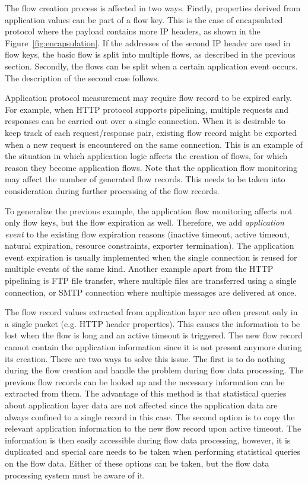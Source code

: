 The flow creation process is affected in two ways. Firstly, properties derived from application values can be part of a flow key. This is the case of encapsulated protocol where the payload contains more IP headers, as shown in the Figure~\ref{fig:encapsulation}. If the addresses of the second IP header are used in flow keys, the basic flow is split into multiple flows, as described in the previous section. Secondly, the flows can be split when a certain application event occurs. The description of the second case follows.

Application protocol measurement may require flow record to be expired early. For example, when HTTP protocol supports pipelining, multiple requests and responses can be carried out over a single connection. When it is desirable to keep track of each request/response pair, existing flow record might be exported when a new request is encountered on the same connection. This is an example of the situation in which application logic affects the creation of flows, for which reason they become application flows. Note that the application flow monitoring may affect the number of generated flow records. This needs to be taken into consideration during further processing of the flow records.

To generalize the previous example, the application flow monitoring affects not only flow keys, but the flow expiration as well. Therefore, we add \emph{application event} to the existing flow expiration reasons (inactive timeout, active timeout, natural expiration, resource constraints, exporter termination). The application event expiration is usually implemented when the single connection is reused for multiple events of the same kind. Another example apart from the HTTP pipelining is FTP file transfer, where multiple files are transferred using a single connection, or SMTP connection where multiple messages are delivered at once.

The flow record values extracted from application layer are often present only in a single packet (e.g. HTTP header properties). This causes the information to be lost when the flow is long and an active timeout is triggered. The new flow record cannot contain the application information since it is not present anymore during its creation. There are two ways to solve this issue. The first is to do nothing during the flow creation and handle the problem during flow data processing. The previous flow records can be looked up and the necessary information can be extracted from them. The advantage of this method is that statistical queries about application layer data are not affected since the application data are always confined to a single record in this case. The second option is to copy the relevant application information to the new flow record upon active timeout. The information is then easily accessible during flow data processing, however, it is duplicated and special care needs to be taken when performing statistical queries on the flow data. Either of these options can be taken, but the flow data processing system must be aware of it.

